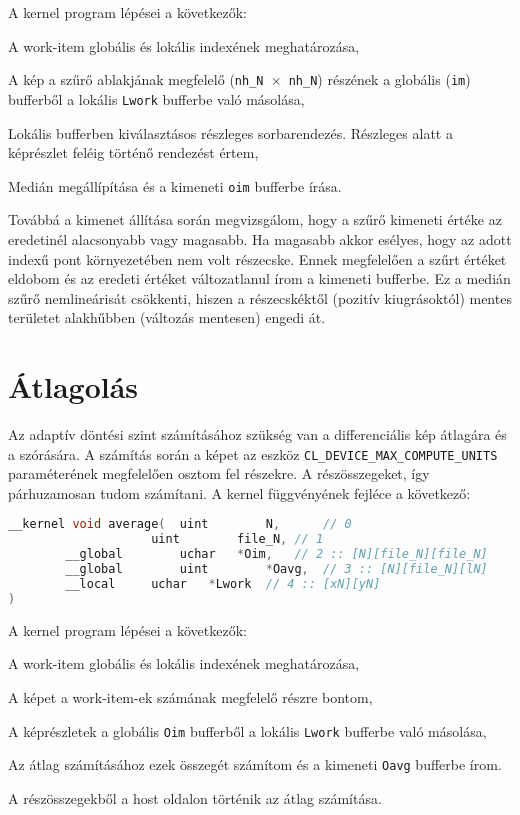 \noindent A kernel program lépései a következők:
	\begin{enumerate*}
		\item A work-item globális és lokális indexének meghatározása,
		\item A kép a szűrő ablakjának megfelelő (\texttt{nh\_N $\times$ nh\_N}) részének a globális (\texttt{im}) bufferből a lokális
		\texttt{Lwork} bufferbe való másolása,
		\item Lokális bufferben kiválasztásos részleges sorbarendezés. Részleges alatt a képrészlet feléig történő rendezést értem,
		\item Medián megállípítása és a kimeneti \texttt{oim} bufferbe írása.
	\end{enumerate*}

\cbstart
\noindent Továbbá a kimenet állítása során megvizsgálom, hogy a szűrő kimeneti értéke az eredetinél alacsonyabb vagy magasabb. Ha magasabb
	akkor esélyes, hogy az adott indexű pont környezetében nem volt részecske. Ennek megfelelően a szűrt értéket
	eldobom és az eredeti értéket változatlanul írom a kimeneti bufferbe. Ez a medián szűrő nemlineárisát csökkenti, hiszen a
	részecskéktől (pozitív kiugrásoktól) mentes területet alakhűbben (változás mentesen) engedi át.
\cbend


\section{Átlagolás}
	Az adaptív döntési szint számításához szükség van a differenciális kép átlagára és a szórására.
	A számítás során a képet az eszköz \texttt{CL\_DEVICE\_MAX\_COMPUTE\_UNITS} paraméterének megfelelően osztom fel részekre. A
	részösszegeket, így párhuzamosan tudom számítani.
	\noindent A kernel függvényének fejléce a következő:
\begin{lstlisting}[language=C++]
__kernel void average(	uint		N,		// 0
					uint		file_N,	// 1					
		__global		uchar	*Oim,	// 2 :: [N][file_N][file_N]
		__global		uint		*Oavg,	// 3 :: [N][file_N][lN]
		__local		uchar	*Lwork	// 4 :: [xN][yN]
)
\end{lstlisting}
	
\noindent A kernel program lépései a következők:
	\begin{enumerate*}
		\item A work-item globális és lokális indexének meghatározása,
		\item A képet a work-item-ek számának megfelelő részre bontom,
		\item A képrészletek a globális \texttt{Oim} bufferből a lokális \texttt{Lwork} bufferbe való másolása,
		\item Az átlag számításához ezek összegét számítom és a kimeneti \texttt{Oavg} bufferbe írom.
	\end{enumerate*}
	A részösszegekből a host oldalon történik az átlag számítása.

